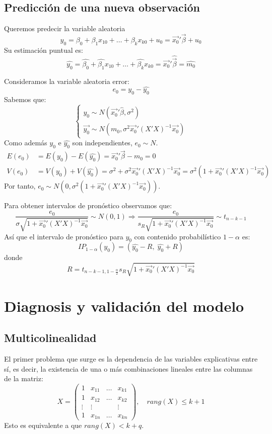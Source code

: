 \documentclass{report}
\theoremstyle{remark}
\theoremstyle{remark}
\theoremstyle{remark}
\theoremstyle{definition}
\theoremstyle{definition}
\theoremstyle{definition}
\begin{document}
\subsection*{Predicción de una nueva observación}
Queremos predecir la variable aleatoria
$$y_0 = \beta_0 + \beta_1x_{10} + \dots + \beta_kx_{k0} + u_0 = \vec{x_0}'\vec{\beta} + u_0$$
Su estimación puntual es:
$$\hat{y_0} = \hat{\beta_0} + \hat{\beta_1}x_{10} + \dots + \hat{\beta_k}x_{k0} = \vec{x_0}'\hat{\vec{\beta}} = \hat{m_0}$$

Consideramos la variable aleatoria error:
$$e_0 = y_0 - \hat{y_0}$$
Sabemos que:
$$\begin{cases}
        y_0 \sim N(\vec{x_0}'\hat{\beta}, \sigma^2) \\
        \vec{y_0} \sim N(m_0, \sigma^2\vec{x_0}'(X'X)^{-1}\vec{x_0})
    \end{cases}$$
Como además $y_0$ e $\hat{y_0}$ son independientes, $e_0 \sim N$.
\begin{align*}
    E(e_0) & = E(y_0) - E(\hat{y_0}) = \vec{x_0}'\vec{\beta} - m_0 = 0                                                                 \\
    V(e_0) & = V(y_0) + V(\hat{y_0}) = \sigma^2 + \sigma^2\vec{x_0}'(X'X)^{-1}\vec{x_0} = \sigma^2 (1 + \vec{x_0}'(X'X)^{-1}\vec{x_0})
\end{align*}
Por tanto, $e_0 \sim N(0, \sigma^2 (1 + \vec{x_0}'(X'X)^{-1}\vec{x_0}))$.

Para obtener intervalos de pronóstico observamos que:
$$\frac{e_0}{\sigma\sqrt{1+\vec{x_0}'(X'X)^{-1}\vec{x_0}}} \sim N(0, 1) \Rightarrow \frac{e_0}{s_R\sqrt{1+\vec{x_0}'(X'X)^{-1}\vec{x_0}}} \sim t_{n-k-1}$$
Así que el intervalo de pronóstico para $y_0$ con contenido probabilístico $1-\alpha$ es:
$$IP_{1-\alpha}(y_0) = (\hat{y_0} - R, \; \hat{y_0} + R)$$
donde
$$R = t_{n-k-1, 1-\frac{\alpha}{2}} s_R\sqrt{1+\vec{x_0}'(X'X)^{-1}\vec{x_0}}$$

\section{Diagnosis y validación del modelo}
\subsection*{Multicolinealidad}
El primer problema que surge es la dependencia de las variables explicativas entre sí, es decir, la existencia de una o más combinaciones lineales entre las columnas de la matriz:
$$X = \begin{pmatrix}
        1      & x_{11} & \dots & x_{k1} \\
        1      & x_{12} & \dots & x_{k2} \\
        \vdots & \vdots &       & \vdots \\
        1      & x_{1n} & \dots & x_{kn}
    \end{pmatrix}, \quad rang(X) \leq k+1$$
Esto es equivalente a que $rang(X) < k+q$.
\end{document}
